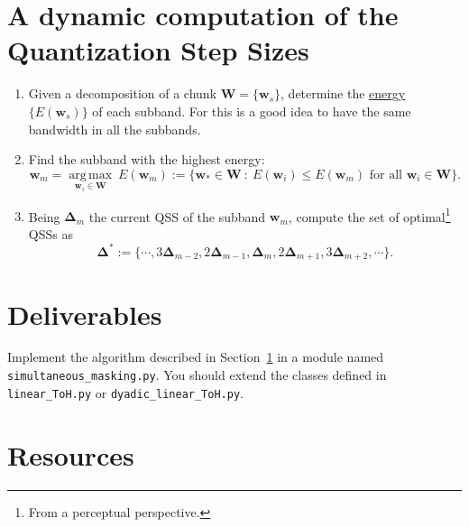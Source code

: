 \section{A dynamic computation of the Quantization Step Sizes}
\label{sec:algo}
\begin{enumerate}
\item Given a decomposition of a chunk
  ${\mathbf W}=\{{\mathbf w}_s\}$, determine the
  \href{https://en.wikipedia.org/wiki/Energy_(signal_processing)}{energy}
  $\{E({\mathbf w}_s)\}$ of each subband. For this is a good idea to
  have the same bandwidth in all the subbands.
\item Find the subband with the highest energy:
  \begin{equation}
    {\mathbf w}_m = \underset{{\mathbf w}_i \in {\mathbf W}}{\operatorname{arg\,max}}~E({\mathbf w}_m) := \{{\mathbf w}_* \in {\mathbf W} ~:~ E({\mathbf w}_i) \leq E({\mathbf w}_m) \text{ for all } {\mathbf w}_i \in {\mathbf W} \}.
  \end{equation}
\item Being ${\mathbf \Delta}_m$ the current QSS of the subband
  ${\mathbf w}_m$, compute the set of optimal\footnote{From a
    perceptual perspective.} QSSs as
  \begin{equation}
    {\mathbf \Delta}^* := \{\cdots,3{\mathbf \Delta}_{m-2},2{\mathbf \Delta}_{m-1},{\mathbf \Delta}_m,2{\mathbf \Delta}_{m+1},3{\mathbf \Delta}_{m+2}, \cdots\}.
  \end{equation}
\end{enumerate}

\section{Deliverables}

Implement the algorithm described in Section~\ref{sec:algo} in a
module named \verb|simultaneous_masking.py|. You should extend the
classes defined in \verb|linear_ToH.py| or
\verb|dyadic_linear_ToH.py|.

\section{Resources}



